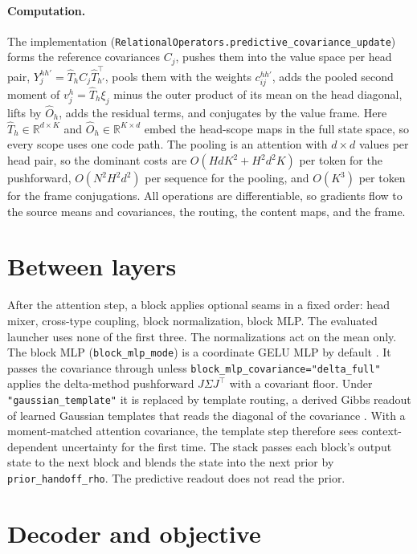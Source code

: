 \documentclass[11pt]{article}
\theoremstyle{definition}
\theoremstyle{remark}
\newcommand{\cfg}[1]{\texttt{#1}}
\begin{document}
\paragraph{Computation.}
The implementation (\cfg{RelationalOperators.predictive\_covariance\_update}) forms the reference covariances $C_j$, pushes them into the value space per head pair, $Y_j^{hh'}=\hat T_hC_j\hat T_{h'}^{\top}$, pools them with the weights $c_{ij}^{hh'}$, adds the pooled second moment of $v_j^{h}=\hat T_h\xi_j$ minus the outer product of its mean on the head diagonal, lifts by $\hat O_h$, adds the residual terms, and conjugates by the value frame. Here $\hat T_h\in\mathbb R^{d\times K}$ and $\hat O_h\in\mathbb R^{K\times d}$ embed the head-scope maps in the full state space, so every scope uses one code path. The pooling is an attention with $d\times d$ values per head pair, so the dominant costs are $O(HdK^2+H^2d^2K)$ per token for the pushforward, $O(N^2H^2d^2)$ per sequence for the pooling, and $O(K^3)$ per token for the frame conjugations. All operations are differentiable, so gradients flow to the source means and covariances, the routing, the content maps, and the frame.

\section{Between layers}
\label{sec:block}

After the attention step, a block applies optional seams in a fixed order: head mixer, cross-type coupling, block normalization, block MLP. The evaluated launcher uses none of the first three. The normalizations act on the mean only. The block MLP (\cfg{block\_mlp\_mode}) is a coordinate GELU MLP by default \citep{hendrycks2016}. It passes the covariance through unless \cfg{block\_mlp\_covariance="delta\_full"} applies the delta-method pushforward $J\Sigma J^{\top}$ with a covariant floor. Under \cfg{"gaussian\_template"} it is replaced by template routing, a derived Gibbs readout of learned Gaussian templates that reads the diagonal of the covariance \citep{dennis2026template}. With a moment-matched attention covariance, the template step therefore sees context-dependent uncertainty for the first time. The stack passes each block's output state to the next block and blends the state into the next prior by \cfg{prior\_handoff\_rho}. The predictive readout does not read the prior.

\section{Decoder and objective}
\label{sec:decode}
\end{document}
